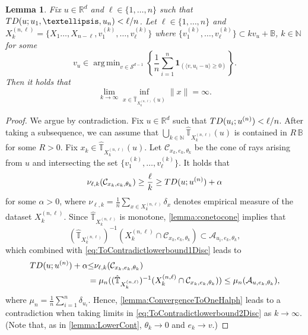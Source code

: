 \documentclass[11pt]{article}
\DeclareMathOperator*{\argmin}{arg\,min}
\newcommand{\R}{\mathbb{R}}
\newcommand{\N}{\mathbb{N}}
\theoremstyle{plain}
\newtheorem{lemma}[sectioncount]{Lemma}
\theoremstyle{definition}
\begin{document}
%
\begin{lemma}\label{lemma:UpperDisc}  { Fix $u\in \R^d$ and $\ell\in \{1, \dots, n\}$  such that ${\rm TD}(u;u_1, \dots, u_n)<\ell/n$.}
 Let $\ell \in \{1, \dots, n\}$ and  $X^{(n,\ell)}_{k}=\{ X_1 \dots, X_{n-\ell},v_1^{(k)}, \dots, v_\ell^{(k)}\}$  where $\{v_1^{(k)}, \dots, v_\ell^{(k)} \}\subset  k v_u+\mathbb{B}$,  $k\in \N$ for some
 $$v_u\in \argmin_{v\in \mathcal{S}^{d-1}} \left\{ \frac{1}{n} \sum_{i=1}^{n} \mathbf{1}_{\left( \langle v, u_i - u \rangle \geq 0 \right)} \right\}.$$   
Then it holds that  
 $$\lim_{k\to \infty} \inf_{x\in \hat{\mathbb{T}}_{X^{(n,\ell)}_{k}}(u)}\|x \|=\infty.$$ 
\end{lemma}
\begin{proof}
  We argue by contradiction.  {Fix $u\in \R^d$  such that ${\rm TD}(u_i;u^{(n)})<\ell/n$.}    After taking a subsequence, we can assume that   {$\bigcup_{k\in \N}\hat{\mathbb{T}}_{X^{(n,\ell)}_{k}}(u) $} is contained in $R\,\mathbb{B}$ for some $R>0$. Fix  {$x_k\in \hat{\mathbb{T}}_{X^{(n,\ell)}_{k}}(u)$.}  Let $\mathcal{C}_{x_k, e_k,\theta_k}$ be the cone of rays arising from $u $ and  {intersecting} the set $\{v_1^{(k)}, \dots, v_\ell^{(k)}\}$. It holds that 
    \begin{equation}
    \label{eq:ToContradictlowerbound1Disc}
    \nu_{\ell, k}(\mathcal{C}_{x_k,e_k,\theta_k})\geq \frac{\ell}{k} \geq {\rm TD}( {u};u^{(n)})+\alpha
\end{equation}
%
  for some $\alpha>0$, where $\nu_{\ell, k}=\frac{1}{n}\sum_{x\in X^{(n,\ell)}_{k}}\delta_{x}$ denotes empirical measure of the dataset $X^{(n,\ell)}_{k}$.  Since  {$\hat{\mathbb{T}}_{X^{(n,\ell)}_{k}}$} is monotone, \autoref{lemma:conetocone} implies that
$$(\hat{ {\mathbb{T}}}_{X^{(n,\ell)}_{k}})^{-1}(X^{(n,\ell)}_{k}\cap \mathcal{C}_{x_k,e_k,\theta_k})\subset  \mathcal{A}_{u_i,e_k,\theta_k},  $$
%
which combined with \eqref{eq:ToContradictlowerbound1Disc} leads to
%
\begin{align}
    \begin{split}
        \label{eq:ToContradictlowerbound2Disc}
 {\rm TD}( {u};u^{(n)})+\alpha  & {\le} \nu_{\ell,k}(\mathcal{C}_{x_k,e_k,\theta_k}) \\
 &=\mu_n((\hat{ {\mathbb{T}}}_{X^{(n,\ell)}_{k}})^{-1}(X^{(n,\ell)}_{k}\cap \mathcal{C}_{x_k,e_k,\theta_k} ) {)}
 \leq  \mu_n(\mathcal{A}_{ {u},e_k,\theta_k}),
    \end{split}
\end{align}
where $\mu_n=\frac{1}{n}\sum_{i=1}^n\delta_{u_i}$. 
Hence, \autoref{lemma:ConvergenceToOneHalph} leads to a contradiction when taking limits in \eqref{eq:ToContradictlowerbound2Disc} as $k\to \infty$. (Note that, as in \autoref{lemma:LowerCont}, $\theta_k\to 0  $ and $e_k\to v$.) 
\end{proof}
\end{document}
